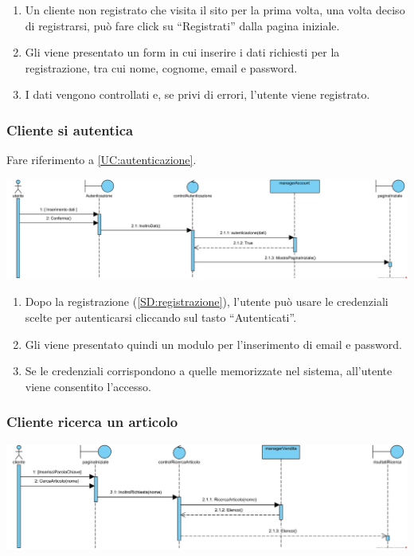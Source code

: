 \documentclass[12pt]{article}
\begin{document}
\begin{enumerate}
\item Un cliente non registrato che visita il sito per la prima volta, una volta deciso di registrarsi, può fare click su ``Registrati'' dalla pagina iniziale.
\item Gli viene presentato un form in cui inserire i dati richiesti per la registrazione, tra cui nome, cognome, email e password.
\item I dati vengono controllati e, se privi di errori, l'utente viene registrato.
\end{enumerate}

\subsubsection{Cliente si autentica}
\label{SD:login}

Fare riferimento a \ref{UC:autenticazione}. \\

\begin{center}
\includegraphics[width=\textwidth]{SequenceDiagram/Autenticazione}
\end{center}

\begin{enumerate}
\item Dopo la registrazione (\ref{SD:registrazione}), l'utente può usare le credenziali scelte per autenticarsi cliccando sul tasto ``Autenticati''.
\item Gli viene presentato quindi un modulo per l'inserimento di email e password.
\item Se le credenziali corrispondono a quelle memorizzate nel sistema, all'utente viene consentito l'accesso.
\end{enumerate}

\subsubsection{Cliente ricerca un articolo}
\label{SD:ricerca}

\begin{center}
\includegraphics[width=\textwidth]{SequenceDiagram/ClienteArticoloRicerca}
\end{center}
\end{document}
